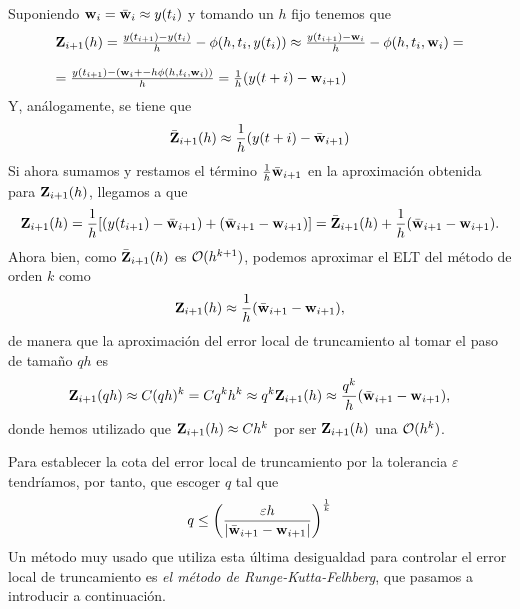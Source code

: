 Suponiendo $\vb{w}{}_i = \bar{\vb{w}{}}_i \approx y(t_i)$ y tomando un $h$ fijo tenemos que
\begin{equation*}
\begin{array}{l}
    \vb{Z}{}_{i+1}(h) = \frac{y(t_{i+1}) - y(t_i)}{h} - \phi(h, t_i, y(t_i)) \approx  \frac{y(t_{i+1}) - \vb{w}{}_i}{h} - \phi(h, t_i, \vb{w}{}_i) =\\
    \\
     =\frac{y(t_{i+1}) - (\vb{w}{}_i+ - h\phi(h, t_i, \vb{w}{}_i))}{h} = \frac{1}{h}(y(t+i)-\vb{w}{}_{i+1})
\end{array}
\end{equation*}
Y, análogamente, se tiene que 
\begin{equation*}
    \bar{\vb{Z}{}}_{i+1}(h) \approx \frac{1}{h}(y(t+i)-\bar{\vb{w}{}}_{i+1})
\end{equation*}
Si ahora sumamos y restamos el término $\frac{1}{h}\bar{\vb{w}{}}_{i+1}$
en la aproximación obtenida para $\vb{Z}{}_{i+1}(h)$,
llegamos a que
\begin{equation*}
    \vb{Z}{}_{i+1}(h) = \frac{1}{h}[(y(t_{i+1})-\bar{\vb{w}{}}_{i+1}) + (\bar{\vb{w}{}}_{i+1} - \vb{w}{}_{i+1})] = \bar{\vb{Z}{}}_{i+1}(h) + \frac{1}{h}(\bar{\vb{w}{}}_{i+1}-\vb{w}{}_{i+1}).
\end{equation*}
Ahora bien, como $\bar{\vb{Z}{}}_{i+1}(h)$ es $\vb{\mathcal{O}}{}(h^{k+1})$,
podemos aproximar el ELT del método de orden $k$ como
\begin{equation*}
\vb{Z}{}_{i+1}(h) \approx \frac{1}{h}(\bar{\vb{w}{}}_{i+1}-\vb{w}{}_{i+1}),
\end{equation*}
de manera que la aproximación del error local de truncamiento
al tomar el paso de tamaño $qh$ es
\begin{equation*}
    \vb{Z}{}_{i+1}(qh)\approx C(qh)^k = Cq^kh^k \approx q^k \vb{Z}{}_{i+1}(h) \approx \frac{q^k}{h}(\bar{\vb{w}{}}_{i+1}-\vb{w}{}_{i+1}),
\end{equation*}
donde hemos utilizado que $\vb{Z}{}_{i+1}(h) \approx Ch^k$
por ser $\vb{Z}{}_{i+1}(h)$ una $\vb{\mathcal{O}}{}(h^k)$.

Para establecer la cota del error local de truncamiento
por la tolerancia $\varepsilon$ tendríamos, por tanto,
que escoger $q$ tal que
\begin{equation*}
    q \leq \left(\frac{\varepsilon h}{|\bar{\vb{w}{}}_{i+1} - \vb{w}{}_{i+1}|}\right)^{\frac{1}{k}}
\end{equation*}
Un método muy usado que utiliza esta última desigualdad para
controlar el error local de truncamiento es
\emph{el método de Runge-Kutta-Felhberg},
que pasamos a introducir a continuación.

